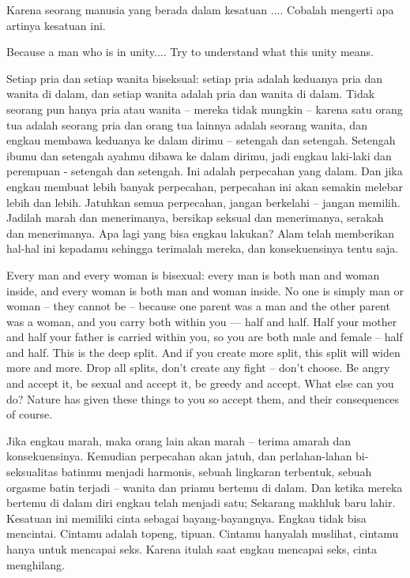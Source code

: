 \bahasa
Karena seorang manusia yang berada dalam kesatuan .... Cobalah mengerti apa artinya kesatuan ini.

\english
Because a man who is in unity.... Try to understand what this unity means.

\bahasa
Setiap pria dan setiap wanita biseksual: setiap pria adalah keduanya pria dan wanita di dalam, dan setiap wanita adalah pria dan wanita di dalam. Tidak seorang pun hanya pria atau wanita -- mereka tidak mungkin -- karena satu orang tua adalah seorang pria dan orang tua lainnya adalah seorang wanita, dan engkau membawa keduanya ke dalam dirimu -- setengah dan setengah. Setengah ibumu dan setengah ayahmu dibawa ke dalam dirimu, jadi engkau laki-laki dan perempuan - setengah dan setengah. Ini adalah perpecahan yang dalam. Dan jika engkau membuat lebih banyak perpecahan, perpecahan ini akan semakin melebar lebih dan lebih. Jatuhkan semua perpecahan, jangan berkelahi -- jangan memilih. Jadilah marah dan menerimanya, bersikap seksual dan menerimanya, serakah dan menerimanya. Apa lagi yang bisa engkau lakukan? Alam telah memberikan hal-hal ini kepadamu sehingga terimalah mereka, dan konsekuensinya tentu saja.

\english
Every man and every woman is bisexual: every man is both man and woman inside, and every woman is both man and woman inside. No one is simply man or woman -- they cannot be -- because one parent was a man and the other parent was a woman, and you carry both within you --- half and half. Half your mother and half your father is carried within you, so you are both male and female -- half and half. This is the deep split. And if you create more split, this split will widen more and more. Drop all splits, don't create any fight -- don't choose. Be angry and accept it, be sexual and accept it, be greedy and accept. What else can you do? Nature has given these things to you so accept them, and their consequences of course.

\bahasa
Jika engkau marah, maka orang lain akan marah -- terima amarah dan konsekuensinya. Kemudian perpecahan akan jatuh, dan perlahan-lahan bi-seksualitas batinmu menjadi harmonis, sebuah lingkaran terbentuk, sebuah orgasme batin terjadi -- wanita dan priamu bertemu di dalam. Dan ketika mereka bertemu di dalam diri engkau telah menjadi satu; Sekarang makhluk baru lahir. Kesatuan ini memiliki cinta sebagai bayang-bayangnya. Engkau tidak bisa mencintai. Cintamu adalah topeng, tipuan. Cintamu hanyalah muslihat, cintamu hanya untuk mencapai seks. Karena itulah saat engkau mencapai seks, cinta menghilang.

